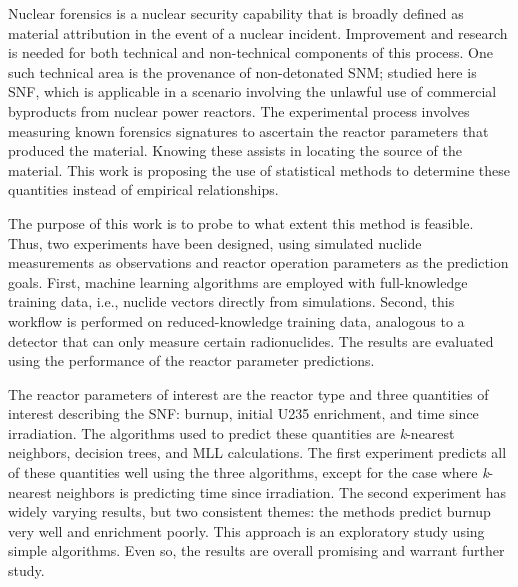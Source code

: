 Nuclear forensics is a nuclear security capability that is broadly defined as
material attribution in the event of a nuclear incident.  Improvement and
research is needed for both technical and non-technical components of this
process.  One such technical area is the provenance of non-detonated \gls{SNM};
studied here is \gls{SNF}, which is applicable in a scenario involving the
unlawful use of commercial byproducts from nuclear power reactors.  The
experimental process involves measuring known forensics signatures to ascertain
the reactor parameters that produced the material. Knowing these assists in
locating the source of the material. This work is proposing the use of
statistical methods to determine these quantities instead of empirical
relationships. 

The purpose of this work is to probe to what extent this method is feasible.
Thus, two experiments have been designed, using simulated nuclide measurements
as observations and reactor operation parameters as the prediction goals.
First, machine learning algorithms are employed with full-knowledge training
data, i.e., nuclide vectors directly from simulations.  Second, this workflow
is performed on reduced-knowledge training data, analogous to a detector that
can only measure certain radionuclides. The results are evaluated using the
performance of the reactor parameter predictions.

The reactor parameters of interest are the reactor type and three quantities of
interest describing the \gls{SNF}: burnup, initial \gls{U235} enrichment, and
time since irradiation. The algorithms used to predict these quantities are
\textit{k}-nearest neighbors, decision trees, and \gls{MLL} calculations. The
first experiment predicts all of these quantities well using the three
algorithms, except for the case where \textit{k}-nearest neighbors is
predicting time since irradiation. The second experiment has widely varying
results, but two consistent themes: the methods predict burnup very well and
enrichment poorly. This approach is an exploratory study using simple
algorithms. Even so, the results are overall promising and warrant further
study.

